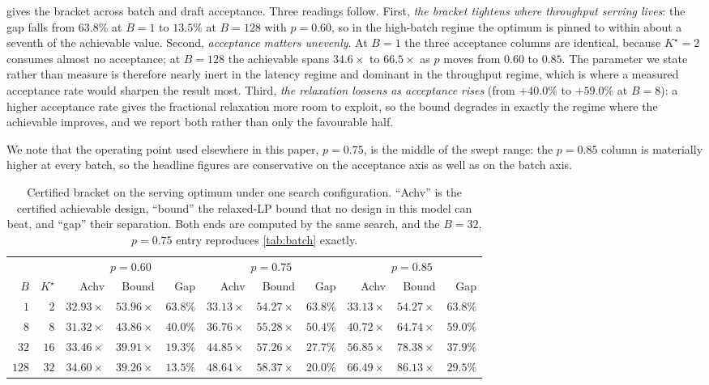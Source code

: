  gives the bracket across batch and draft acceptance. Three
readings follow. First, \emph{the bracket tightens where throughput serving
lives}: the gap falls from $63.8\%$ at $B=1$ to $13.5\%$ at $B=128$ with
$p=0.60$, so in the high-batch regime the optimum is pinned to within about a
seventh of the achievable value. Second, \emph{acceptance matters unevenly}. At
$B=1$ the three acceptance columns are identical, because $K^\star=2$ consumes
almost no acceptance; at $B=128$ the achievable spans $34.6\times$ to
$66.5\times$ as $p$ moves from $0.60$ to $0.85$. The parameter we state rather
than measure is therefore nearly inert in the latency regime and dominant in the
throughput regime, which is where a measured acceptance rate would sharpen the
result most. Third, \emph{the relaxation loosens as acceptance rises} (from
$+40.0\%$ to $+59.0\%$ at $B=8$): a higher acceptance rate gives the fractional
relaxation more room to exploit, so the bound degrades in exactly the regime
where the achievable improves, and we report both rather than only the
favourable half.

We note that the operating point used elsewhere in this paper, $p=0.75$, is the
middle of the swept range: the $p=0.85$ column is materially higher at every
batch, so the headline figures are conservative on the acceptance axis as well
as on the batch axis.

\begin{table}[h]
\centering
\footnotesize
\caption{Certified bracket on the serving optimum under one search configuration.
``Achv'' is the certified achievable design, ``bound'' the relaxed-LP bound that
no design in this model can beat, and ``gap'' their separation. Both ends are
computed by the same search, and the $B=32$, $p=0.75$ entry reproduces
\cref{tab:batch} exactly.}
\label{tab:gap}
\begin{tabular}{@{}rr rrr rrr rrr@{}}
\toprule
& & \multicolumn{3}{c}{$p=0.60$} & \multicolumn{3}{c}{$p=0.75$} & \multicolumn{3}{c}{$p=0.85$} \\
\cmidrule(lr){3-5}\cmidrule(lr){6-8}\cmidrule(lr){9-11}
$B$ & $K^\star$ & Achv & Bound & Gap & Achv & Bound & Gap & Achv & Bound & Gap \\
\midrule
$1$   & $2$  & $32.93\times$ & $53.96\times$ & $63.8\%$ & $33.13\times$ & $54.27\times$ & $63.8\%$ & $33.13\times$ & $54.27\times$ & $63.8\%$ \\
$8$   & $8$  & $31.32\times$ & $43.86\times$ & $40.0\%$ & $36.76\times$ & $55.28\times$ & $50.4\%$ & $40.72\times$ & $64.74\times$ & $59.0\%$ \\
$32$  & $16$ & $33.46\times$ & $39.91\times$ & $19.3\%$ & $44.85\times$ & $57.26\times$ & $27.7\%$ & $56.85\times$ & $78.38\times$ & $37.9\%$ \\
$128$ & $32$ & $34.60\times$ & $39.26\times$ & $\mathbf{13.5\%}$ & $48.64\times$ & $58.37\times$ & $20.0\%$ & $66.49\times$ & $86.13\times$ & $29.5\%$ \\
\bottomrule
\end{tabular}
\end{table}

